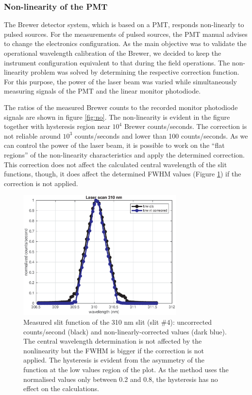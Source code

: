 \documentclass[acp, manuscript]{copernicus}
\begin{document}
\subsubsection{Non-linearity of the PMT }

The Brewer detector system, which is based on a PMT, responds non-linearly to pulsed sources. For the measurements of pulsed sources, the PMT manual advises to change the electronics configuration. As the main objective was to validate the operational wavelength calibration of the Brewer, we decided to keep the instrument configuration equivalent to that during the field operations. The non-linearity problem was solved by determining the respective correction function. For this purpose, the power of the laser beam was varied while simultaneously measuring signals of the PMT and the linear monitor photodiode.


The ratios of the measured Brewer counts to the recorded monitor photodiode signals are shown in figure  \ref{fig:no}. The non-linearity is evident in the figure together with hysteresis region near $10^4$  Brewer counts/seconds. The correction is not reliable  around $10^3$ counts/seconds and lower than 100 counts/seconds. As we can control the power of the laser beam, it is possible to work on the “flat regions” of the non-linearity characteristics and apply the determined correction. This correction does not affect the calculated central wavelength of the slit functions, though, it does affect the determined FWHM values (Figure \ref{fig:slitcor}) if the correction is not applied.




\begin{figure}[t]
\includegraphics[width=8.3cm]{figures/General_Corrected_vs_uncorrected.eps}
\caption{Measured slit function of the 310 nm slit (slit \#4): uncorrected counts/second (black) and non-linearly-corrected values (dark blue). The central wavelength determination is not affected by the nonlinearity but the FWHM is bigger if the correction is not applied. The hysteresis is evident from the asymmetry of the function at the low values region of the plot. As the method uses the normalised values only between 0.2 and 0.8, the hysteresis has no effect on the calculations.}
\label{fig:slitcor}
\end{figure}
\end{document}

